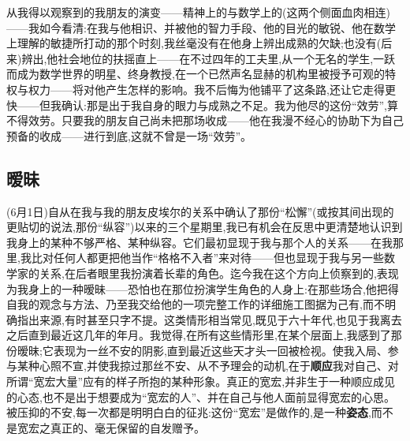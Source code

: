 从我得以观察到的我朋友的演变——精神上的与数学上的(这两个侧面血肉相连)——我如今看清:在我与他相识、并被他的智力手段、他的目光的敏锐、他在数学上理解的敏捷所打动的那个时刻,我丝毫没有在他身上辨出成熟的欠缺;也没有(后来)辨出,他社会地位的扶摇直上——在不过四年的工夫里,从一个无名的学生,一跃而成为数学世界的明星、终身教授,在一个已然声名显赫的机构里被授予可观的特权与权力——将对他产生怎样的影响。我不后悔为他铺平了这条路,还让它走得更快——但我确认:那是出于我自身的眼力与成熟之不足。我为他尽的这份“效劳”,算不得效劳。只要我的朋友自己尚未把那场收成——他在我漫不经心的协助下为自己预备的收成——进行到底,这就不曾是一场“效劳”。

\subsection{暧昧}


(6月1日)自从在我与我的朋友皮埃尔的关系中确认了那份“松懈”(或按其间出现的更贴切的说法,那份“纵容”)以来的三个星期里,我已有机会在反思中更清楚地认识到我身上的某种不够严格、某种纵容。它们最初显现于我与那个人的关系——在我那里,我比对任何人都更把他当作“格格不入者”来对待——但也显现于我与另一些数学家的关系,在后者眼里我扮演着长辈的角色。迄今我在这个方向上侦察到的\dmark{},表现为我身上的一种暧昧——恐怕也在那位扮演学生角色的人身上:在那些场合,他把得自我的观念与方法、乃至我交给他的一项完整工作的详细施工图据为己有,而不明确指出来源,有时甚至只字不提。这类情形相当常见,既见于六十年代,也见于我离去之后直到最近这几年的年月。我觉得,在所有这些情形里,在某个层面上,我感到了那份暧昧;它表现为一丝不安的阴影,直到最近这些天才头一回被检视。使我入局、参与某种心照不宣,并使我掠过那丝不安、从不予理会的动机,在于\textbf{顺应}我对自己、对所谓“宽宏大量”应有的样子所抱的某种形象。真正的宽宏,并非生于一种顺应成见的心态,也不是出于想要成为“宽宏的人”、并在自己与他人面前显得宽宏的心思。被压抑的不安,每一次都是明明白白的征兆:这份“宽宏”是做作的,是一种\textbf{姿态},而不是宽宏之真正的、毫无保留的自发赠予。

